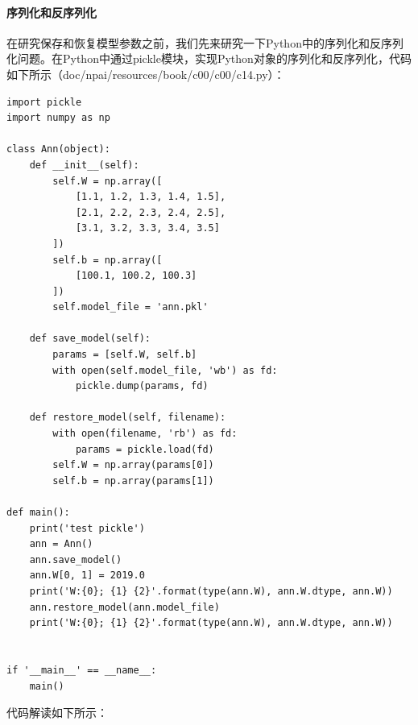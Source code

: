 \documentclass[UTF8]{article}
\begin{document}
\paragraph{序列化和反序列化}
在研究保存和恢复模型参数之前，我们先来研究一下Python中的序列化和反序列化问题。在Python中通过pickle模块，实现Python对象的序列化和反序列化，代码如下所示（doc/npai/resources/book/c00/c00/c14.py）：
\begin{lstlisting}
import pickle
import numpy as np

class Ann(object):
    def __init__(self):
        self.W = np.array([
            [1.1, 1.2, 1.3, 1.4, 1.5],
            [2.1, 2.2, 2.3, 2.4, 2.5],
            [3.1, 3.2, 3.3, 3.4, 3.5]
        ])
        self.b = np.array([
            [100.1, 100.2, 100.3]
        ])
        self.model_file = 'ann.pkl'

    def save_model(self):
        params = [self.W, self.b]
        with open(self.model_file, 'wb') as fd:
            pickle.dump(params, fd)

    def restore_model(self, filename):
        with open(filename, 'rb') as fd:
            params = pickle.load(fd)
        self.W = np.array(params[0])
        self.b = np.array(params[1])

def main():
    print('test pickle')
    ann = Ann()
    ann.save_model()
    ann.W[0, 1] = 2019.0
    print('W:{0}; {1} {2}'.format(type(ann.W), ann.W.dtype, ann.W))
    ann.restore_model(ann.model_file)
    print('W:{0}; {1} {2}'.format(type(ann.W), ann.W.dtype, ann.W))
    

if '__main__' == __name__:
    main()
\end{lstlisting}
代码解读如下所示：
\end{document}
